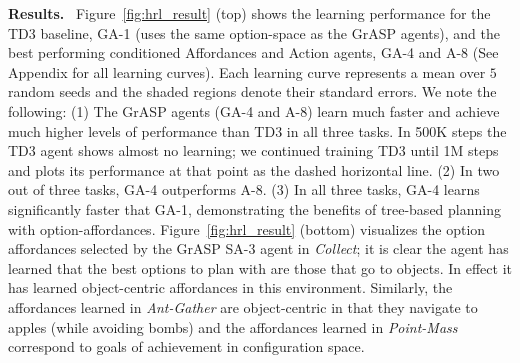 \documentclass[nohyperref]{article}
\theoremstyle{plain}
\theoremstyle{definition}
\theoremstyle{remark}
\newcommand{\grasp}{{G}r{ASP} }
\renewcommand{\paragraph}[1]{\textbf{#1}\ }
\begin{document}
\paragraph{Results.} Figure~\ref{fig:hrl_result} (top) shows the learning performance 
for the TD3 baseline, GA-1 (uses the same option-space as the \grasp agents), and the best performing conditioned Affordances and Action agents, GA-4 and A-8 (See Appendix for all learning curves). 
Each learning curve represents a mean over $5$ random seeds and the shaded regions denote their standard errors.  We note the following: %
(1) The \grasp agents (GA-4 and A-8) learn much faster and achieve much higher levels of performance than TD3 in all three tasks. In 500K steps the TD3 agent shows almost no learning; %
we continued training TD3 until 1M steps and  plots its performance at that point as the dashed horizontal line.
(2) In two out of three tasks, GA-4 outperforms A-8. %
(3) In all three tasks, GA-4 learns significantly faster that GA-1, demonstrating the benefits of tree-based planning with option-affordances. %
Figure~\ref{fig:hrl_result} (bottom) visualizes the option affordances
selected %
by the \grasp SA-3 agent in \emph{Collect};
it is clear the agent  has learned that the best options to plan with are those that go to objects. In effect it has learned object-centric affordances in this environment. Similarly, the affordances learned in \emph{Ant-Gather} are object-centric in that they navigate to apples (while avoiding bombs) and the affordances learned in \emph{Point-Mass} correspond to goals of achievement in configuration space.
 
\end{document}
